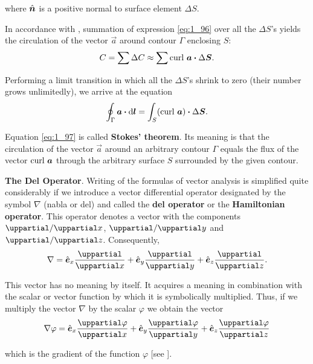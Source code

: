\noindent
where $\hat{\boldsymbol{n}}$ is a positive normal to surface element $\Delta{S}$.

In accordance with , summation of expression \eqref{eq:1_96} over all the $\Delta{S}$'s yields the circulation of the vector $\vec{a}$ around contour $\Gamma$ enclosing $S$:
\begin{equation*}
	C = \sum\Delta{C} \approx \sum\text{curl~}\boldsymbol{a} \boldsymbol{\cdot} \Delta{\boldsymbol{S}}.
\end{equation*}

\noindent
Performing a limit transition in which all the $\Delta{S}$'s shrink to zero (their number grows unlimitedly), we arrive at the equation
\begin{equation}\label{eq:1_97}
	\oint_{\Gamma} \boldsymbol{a}\boldsymbol{\cdot}\mathrm{d}\boldsymbol{l} = \int_S (\text{curl~}\boldsymbol{a}) \boldsymbol{\cdot} \Delta{\boldsymbol{S}}.
\end{equation}

\noindent
Equation \eqref{eq:1_97} is called \textbf{Stokes' theorem}. Its meaning is that the circulation of the vector $\vec{a}$ around an arbitrary contour $\Gamma$ equals the flux of the vector $\text{curl~}\boldsymbol{a}$ through the arbitrary surface $S$ surrounded by the given contour.

\textbf{The Del Operator}. Writing of the formulas of vector analysis is simplified quite considerably if we introduce a vector differential operator designated by the symbol $\nabla$ (nabla or del) and called the \textbf{del operator} or the \textbf{Hamiltonian operator}. This operator denotes a vector with the components $\diffinpartial{}{x}$, $\diffinpartial{}{y}$ and $\diffinpartial{}{z}$. Consequently,
\begin{equation}\label{eq:1_98}
	\nabla = \vecuni{x}\diffpartial{}{x} + \vecuni{y}\diffpartial{}{y} + \vecuni{z}\diffpartial{}{z}.
\end{equation}

\noindent
This vector has no meaning by itself. It acquires a meaning in combination with the scalar or vector function by which it is symbolically multiplied. Thus, if we multiply the vector $\nabla$ by the scalar $\varphi$ we obtain the vector
\begin{equation}\label{eq:1_99}
	\gradop{\varphi} = \vecuni{x}\diffpartial{\varphi}{x} + \vecuni{y}\diffpartial{\varphi}{y} + \vecuni{z}\diffpartial{\varphi}{z}
\end{equation}

\noindent
which is the gradient of the function $\varphi$ [see ].

